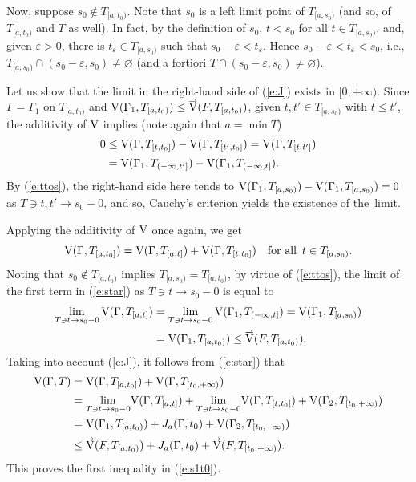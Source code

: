 \documentclass[preprint,12pt]{elsarticle}
\newcommand{\eq}[1]{\mbox{\rm(\ref{#1})}}
\newcommand{\es}{\varnothing}
\newcommand{\vep}{\varepsilon}
\newcommand{\nV}{\mbox{\rm V}}
\newcommand{\riV}{{\scriptstyle\overrightarrow{\mbox{\rm V}}}}
\begin{document}
\begin{pfBV}
Now, suppose $s_0\notin T_{[a,t_0)}$. Note that $s_0$ is a left limit point of
$T_{[a,s_0)}$ (and so, of  $T_{[a,t_0)}$ and $T$ as well).
In fact, by the definition of $s_0$, $t<s_0$
for all $t\in T_{[a,s_0)}$, and, given $\vep>0$, there is $t_\vep\in T_{[a,s_0)}$
such that $s_0-\vep<t_\vep$. Hence $s_0-\vep<t_\vep<s_0$, i.e.,
$T_{[a,s_0)}\cap(s_0-\vep,s_0)\ne\es$ (and a fortiori $T\cap(s_0-\vep,s_0)\ne\es$).

Let us show that the limit in the right-hand side of \eq{e:J} exists in $[0,+\infty)$.
Since $\Gamma=\Gamma_1$ on $T_{[a,t_0)}$ and
$\nV(\Gamma_1,T_{[a,t_0)})\le\riV(F,T_{[a,t_0)})$, given $t,t'\in T_{[a,s_0)}$
with $t\le t'$, the additivity of $\nV$ implies (note again that $a=\min T$)
  \begin{align*}
0&\le\nV(\Gamma,T_{[t,t_0]})-\nV(\Gamma,T_{[t',t_0]})=\nV(\Gamma,T_{[t,t']})
  \\[2pt]
&=\nV(\Gamma_1,T_{(-\infty,t']})-\nV(\Gamma_1,T_{(-\infty,t]}).
  \end{align*}
By \eq{e:ttos}, the right-hand side here tends to
$\nV(\Gamma_1,T_{[a,s_0)})-\nV(\Gamma_1,T_{[a,s_0)})=0$ as $T\ni t,t'\to s_0-0$,
and so, Cauchy's criterion yields the existence of the~limit.

Applying the additivity of $\nV$ once again, we get
  \begin{equation} \label{e:star}
\nV(\Gamma,T_{[a,t_0]})=\nV(\Gamma,T_{[a,t]})+\nV(\Gamma,T_{[t,t_0]})
\quad\mbox{for all \,$t\in T_{[a,s_0)}$.}
  \end{equation}
Noting that $s_0\notin T_{[a,t_0)}$ implies $T_{[a,s_0)}=T_{[a,t_0)}$, by virtue
of \eq{e:ttos}, the limit of the first term in \eq{e:star} as $T\ni t\to s_0-0$ is equal to
  \begin{align*}
\lim_{T\ni t\to s_0-0}\nV(\Gamma,T_{[a,t]})&=
  \lim_{T\ni t\to s_0-0}\nV(\Gamma_1,T_{(-\infty,t]})=
  \nV(\Gamma_1,T_{[a,s_0)})\\[2pt]
&=\nV(\Gamma_1,T_{[a,t_0)})\le\riV(F,T_{[a,t_0)}).
  \end{align*}
Taking into account \eq{e:J}, it follows from \eq{e:star} that
  \begin{align*}
\nV(\Gamma,T)&=\nV(\Gamma,T_{[a,t_0]})+\nV(\Gamma,T_{[t_0,+\infty)})\\[2pt]
&=\lim_{T\ni t\to s_0-0}\!\nV(\Gamma,T_{[a,t]})+
  \lim_{T\ni t\to s_0-0}\!\nV(\Gamma,T_{[t,t_0]})+
  \nV(\Gamma_2,T_{[t_0,+\infty)})\\
&=\nV(\Gamma_1,T_{[a,t_0)})+J_a(\Gamma,t_0)+\nV(\Gamma_2,T_{[t_0,+\infty)})
  \\[2pt]
&\le\riV(F,T_{[a,t_0)})+J_a(\Gamma,t_0)+\riV(F,T_{[t_0,+\infty)}).
  \end{align*}
This proves the first inequality in \eq{e:s1t0}.


\end{pfBV}
\end{document}
